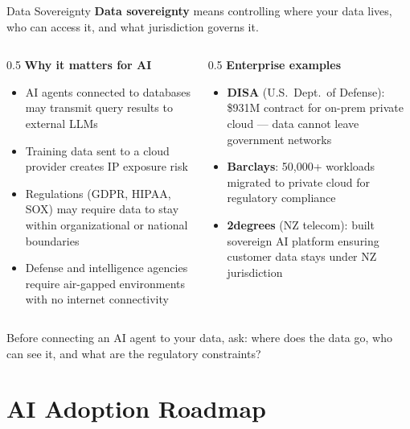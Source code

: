 \documentclass[aspectratio=169]{beamer}
\begin{document}
\begin{frame}[shrink=5]{Data Sovereignty}
\textbf{Data sovereignty} means controlling where your data lives, who can access it, and what jurisdiction governs it.
\vspace{0.3cm}
\begin{columns}[T]
\begin{column}{0.5\textwidth}
\textbf{Why it matters for AI}
\begin{itemize}\small
  \item AI agents connected to databases may transmit query results to external LLMs
  \item Training data sent to a cloud provider creates IP exposure risk
  \item Regulations (GDPR, HIPAA, SOX) may require data to stay within organizational or national boundaries
  \item Defense and intelligence agencies require air-gapped environments with no internet connectivity
\end{itemize}
\end{column}
\begin{column}{0.5\textwidth}
\textbf{Enterprise examples}
\begin{itemize}\small
  \item \textbf{DISA} (U.S.\ Dept.\ of Defense): \$931M contract for on-prem private cloud --- data cannot leave government networks
  \item \textbf{Barclays}: 50{,}000+ workloads migrated to private cloud for regulatory compliance
  \item \textbf{2degrees} (NZ telecom): built sovereign AI platform ensuring customer data stays under NZ jurisdiction
\end{itemize}
\end{column}
\end{columns}
\vspace{0.3cm}
\alert{Before connecting an AI agent to your data, ask: where does the data go, who can see it, and what are the regulatory constraints?}
\end{frame}

\section{AI Adoption Roadmap}
\end{document}
